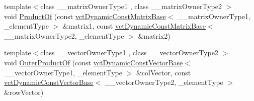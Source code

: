 \begin{DoxyCompactItemize}
\item 
{\footnotesize template$<$class \+\_\+\+\_\+matrix\+Owner\+Type1 , class \+\_\+\+\_\+matrix\+Owner\+Type2 $>$ }\\void \hyperlink{classvct_dynamic_matrix_base_a37c498d1fd0e8178b067f8537f5baf08}{Product\+Of} (const \hyperlink{classvct_dynamic_const_matrix_base}{vct\+Dynamic\+Const\+Matrix\+Base}$<$ \+\_\+\+\_\+matrix\+Owner\+Type1, \+\_\+element\+Type $>$ \&matrix1, const \hyperlink{classvct_dynamic_const_matrix_base}{vct\+Dynamic\+Const\+Matrix\+Base}$<$ \+\_\+\+\_\+matrix\+Owner\+Type2, \+\_\+element\+Type $>$ \&matrix2)
\item 
{\footnotesize template$<$class \+\_\+\+\_\+vector\+Owner\+Type1 , class \+\_\+\+\_\+vector\+Owner\+Type2 $>$ }\\void \hyperlink{classvct_dynamic_matrix_base_a6f6384546a0a1bc3ce2184b3c64ee628}{Outer\+Product\+Of} (const \hyperlink{classvct_dynamic_const_vector_base}{vct\+Dynamic\+Const\+Vector\+Base}$<$ \+\_\+\+\_\+vector\+Owner\+Type1, \+\_\+element\+Type $>$ \&col\+Vector, const \hyperlink{classvct_dynamic_const_vector_base}{vct\+Dynamic\+Const\+Vector\+Base}$<$ \+\_\+\+\_\+vector\+Owner\+Type2, \+\_\+element\+Type $>$ \&row\+Vector)
\end{DoxyCompactItemize}
